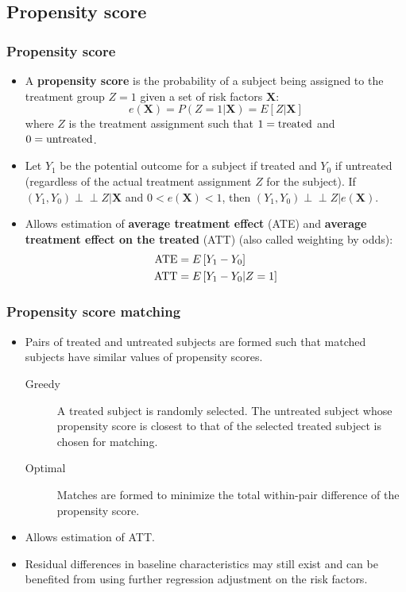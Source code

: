 \documentclass[11pt, aspectratio = 169]{beamer}
\newcommand{\indep}{\perp \!\!\! \perp}
\begin{document}
\subsection{Propensity score}

\begin{frame}
  \frametitle{Propensity score}
  \begin{itemize}
    \item A \textbf{propensity score} is the probability of a subject being assigned to the treatment group $Z = 1$ given a set of risk factors $\mathbf{X}$:
    \begin{equation*}
      e(\mathbf{X}) = P(Z = 1|\mathbf{X}) = E\left[Z|\mathbf{X}\right]
    \end{equation*}
    where $Z$ is the treatment assignment such that $1 = \textnormal{treated}$ and $0 = \textnormal{untreated}$.
    \item Let $Y_1$ be the potential outcome for a subject if treated and $Y_0$ if untreated (regardless of the actual treatment assignment $Z$ for the subject). If $(Y_1, Y_0) \indep Z|\mathbf{X}$ and $0 < e(\mathbf{X}) < 1$, then $(Y_1, Y_0) \indep Z|e(\mathbf{X})$.
    \item Allows estimation of \textbf{average treatment effect} (ATE) and \textbf{average treatment effect on the treated} (ATT) (also called weighting by odds):
    \begin{align*}
      \textnormal{ATE} & = E\left[Y_1 - Y_0\right] \\
      \textnormal{ATT} & = E\left[Y_1 - Y_0|Z = 1\right]
    \end{align*}
  \end{itemize}
\end{frame}

\begin{frame}
  \frametitle{Propensity score matching}
  \begin{itemize}
    \item Pairs of treated and untreated subjects are formed such that matched subjects have similar values of propensity scores.
    \begin{description}
      \item[Greedy] A treated subject is randomly selected. The untreated subject whose propensity score is closest to that of the selected treated subject is chosen for matching.
      \item[Optimal] Matches are formed to minimize the total within-pair difference of the propensity score. 
    \end{description}
    \item Allows estimation of ATT.
    \item Residual differences in baseline characteristics may still exist and can be benefited from using further regression adjustment on the risk factors.
  \end{itemize}
\end{frame}
\end{document}
